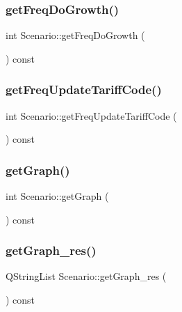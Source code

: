 \mbox{\label{class_scenario_afcb4b66511530fe16514ac36fcd6395f}} 
\subsubsection{\texorpdfstring{getFreqDoGrowth()}{getFreqDoGrowth()}}
{\footnotesize\ttfamily int Scenario\+::get\+Freq\+Do\+Growth (\begin{DoxyParamCaption}{ }\end{DoxyParamCaption}) const}

\mbox{\label{class_scenario_a685a6f6452f7328b3bf8ac9918f54b69}} 
\subsubsection{\texorpdfstring{getFreqUpdateTariffCode()}{getFreqUpdateTariffCode()}}
{\footnotesize\ttfamily int Scenario\+::get\+Freq\+Update\+Tariff\+Code (\begin{DoxyParamCaption}{ }\end{DoxyParamCaption}) const}

\mbox{\label{class_scenario_a39c4892bb1bc3dfe8798ed84d31a6dce}} 
\subsubsection{\texorpdfstring{getGraph()}{getGraph()}}
{\footnotesize\ttfamily int Scenario\+::get\+Graph (\begin{DoxyParamCaption}{ }\end{DoxyParamCaption}) const}

\mbox{\label{class_scenario_a0d09811857de200d557e566750487a0e}} 
\subsubsection{\texorpdfstring{getGraph\_res()}{getGraph\_res()}}
{\footnotesize\ttfamily Q\+String\+List Scenario\+::get\+Graph\+\_\+res (\begin{DoxyParamCaption}{ }\end{DoxyParamCaption}) const}

